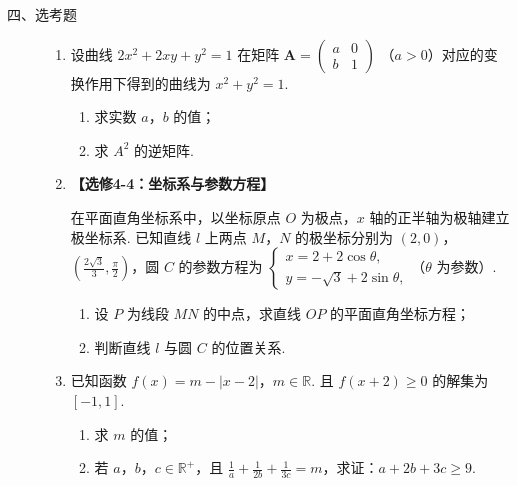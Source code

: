 \begin{description}

    \item[四、选考题]

    \begin{enumerate}[leftmargin=5pt]

      \addtocounter{enumi}{+20}

        \item 设曲线 \(2x^{2} + 2xy + y^{2} = 1\) 在矩阵 \(\mathbf{A} = \begin{pmatrix} a & 0 \\ b & 1 \end{pmatrix}\) （\(a > 0\)）对应的变换作用下得到的曲线为 \(x^{2} + y^{2} = 1\).

\begin{enumerate}
\item 求实数 \(a\)，\(b\) 的值；
\item 求 \(A^{2}\) 的逆矩阵.
\end{enumerate}

        \item \textbf{【选修4-4：坐标系与参数方程】}

在平面直角坐标系中，以坐标原点 \(O\) 为极点，\(x\) 轴的正半轴为极轴建立极坐标系. 已知直线 \(l\) 上两点 \(M\)，\(N\) 的极坐标分别为 \((2,0)\)，\(\left(\frac{2\sqrt{3}}{3},\frac{\pi}{2}\right)\)，圆 \(C\) 的参数方程为 \(\begin{cases}
x = 2 + 2\cos\theta,\\
y = -\sqrt{3} + 2\sin\theta,
\end{cases}\)（\(\theta\) 为参数）.

\begin{enumerate}
\item 设 \(P\) 为线段 \(MN\) 的中点，求直线 \(OP\) 的平面直角坐标方程；
\item 判断直线 \(l\) 与圆 \(C\) 的位置关系.
\end{enumerate}

        \item 已知函数 \(f(x) = m - |x - 2|\)，\(m \in \mathbb{R}\). 且 \(f(x + 2) \geqslant 0\) 的解集为 \([-1,1]\).

\begin{enumerate}
\item 求 \(m\) 的值；
\item 若 \(a\)，\(b\)，\(c \in \mathbb{R}^{+}\)，且 \(\frac{1}{a} + \frac{1}{2b} + \frac{1}{3c} = m\)，求证：\(a + 2b + 3c \geqslant 9\).
\end{enumerate}

    \end{enumerate}

\end{description}


